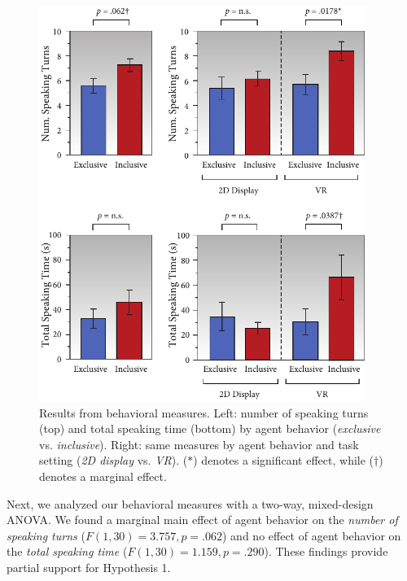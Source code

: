 \begin{figure}
\centering
\includegraphics[width=0.95\textwidth]{conversationalrolegaze/Figures/ResultsBehavioral.pdf}
\caption{Results from behavioral measures. Left: number of speaking turns (top) and total speaking time (bottom) by agent behavior (\emph{exclusive} vs. \emph{inclusive}). Right: same measures by agent behavior and task setting (\emph{2D display} vs. \emph{VR}). ($*$) denotes a significant effect, while ($\dagger$) denotes a marginal effect.}
\label{fig:GazeFootingResultsBehavioral}
\end{figure}

Next, we analyzed our behavioral measures with a two-way, mixed-design ANOVA. We found a marginal main effect of agent behavior on the \emph{number of speaking turns} ($F(1, 30) = 3.757, p = .062$) and no effect of agent behavior on the \emph{total speaking time} ($F(1, 30) = 1.159, p = .290$). These findings provide partial support for Hypothesis 1.

